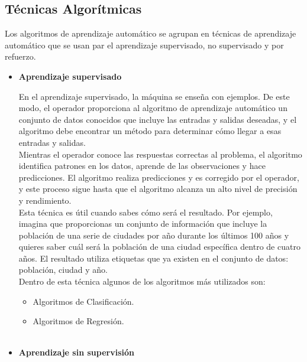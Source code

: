 \documentclass[runningheads,a4paper]{llncs}
\begin{document}
\subsection{T\'ecnicas Algor\'itmicas}
Los algoritmos de aprendizaje autom\'atico se agrupan en t\'ecnicas de aprendizaje autom\'atico que se usan par el aprendizaje supervisado, no supervisado y por refuerzo.
\begin{itemize}

\item {\bf Aprendizaje supervisado }

En el aprendizaje supervisado, la m\'aquina se ense\~na con ejemplos. De este modo, el operador proporciona al algoritmo de aprendizaje autom\'atico un conjunto de datos conocidos que incluye las entradas y salidas deseadas, y el algoritmo debe encontrar un m\'etodo para determinar c\'omo llegar a esas entradas y salidas.\\
Mientras el operador conoce las respuestas correctas al problema, el algoritmo identifica patrones en los datos, aprende de las observaciones y hace predicciones. El algoritmo realiza predicciones y es corregido por el operador, y este proceso sigue hasta que el algoritmo alcanza un alto nivel de precisi\'on y rendimiento.\\

Esta t\'ecnica es \'util cuando sabes c\'omo ser\'a el resultado. Por ejemplo, imagina que proporcionas un conjunto de informaci\'on que incluye la poblaci\'on de una serie de ciudades por a\~no durante los \'ultimos 100 a\~nos y quieres saber cu\'al ser\'a la poblaci\'on de una ciudad espec\'ifica dentro de cuatro años. El resultado utiliza etiquetas que ya existen en el conjunto de datos: poblaci\'on, ciudad y a\~no.\\

Dentro de esta t\'ecnica algunos de los algoritmos m\'as utilizados son:
\begin{itemize}
\item Algoritmos de Clasificaci\'on.
\item Algoritmos de Regresi\'on.\\\\
\end{itemize}


\item {\bf Aprendizaje sin supervisi\'on}


\end{itemize}
\end{document}
